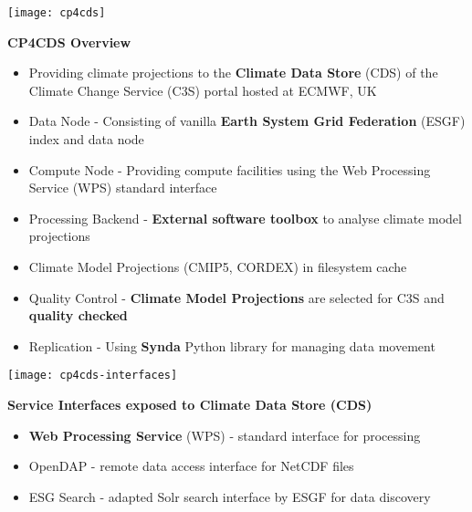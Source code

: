 \documentclass[portrait,a0paper,fontscale=0.4]{baposter} %
\newcommand{\compresslist}{%
\setlength{\itemsep}{1pt}%
\setlength{\parskip}{0pt}%
\setlength{\parsep}{0pt}%
}
\begin{document}
\begin{poster}
{   \begin{minipage}{0.4\textwidth}
     \texttt{[image: cp4cds]}
   \end{minipage}
   \begin{minipage}{0.6\textwidth}
     {\bf CP4CDS Overview}
     \begin{itemize}\compresslist
       \item Providing climate projections to the {\bf Climate Data Store} (CDS) of the
        Climate Change Service (C3S) portal hosted at ECMWF, UK
       \item Data Node - Consisting of vanilla {\bf Earth System Grid Federation} (ESGF) index and data node
       \item Compute Node - Providing compute facilities using the Web Processing Service (WPS) standard interface
       \item Processing Backend - {\bf External software toolbox} to analyse climate model projections
       \item Climate Model Projections (CMIP5, CORDEX) in filesystem cache
       \item Quality Control - {\bf Climate Model Projections} are selected for C3S and {\bf quality checked}
       \item Replication - Using {\bf Synda} Python library for managing data movement
     \end{itemize}
  \end{minipage}
  \vspace{1em}

  \begin{minipage}{0.4\textwidth}
    \texttt{[image: cp4cds-interfaces]}
  \end{minipage}
  \begin{minipage}{0.6\textwidth}
    {\bf Service Interfaces exposed to Climate Data Store (CDS)}
    \begin{itemize}\compresslist
      \item {\bf Web Processing Service} (WPS) - standard interface for processing
      \item OpenDAP - remote data access interface for NetCDF files
      \item ESG Search - adapted Solr search interface by ESGF for data discovery
    \end{itemize}
 \end{minipage}
 \vspace{1em}

}
\end{poster}
\end{document}
